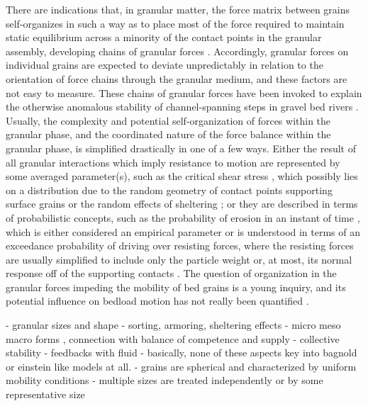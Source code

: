 \documentclass{article}
\begin{document}
{There are indications that, in granular matter, the force matrix between grains self-organizes in such a way as to place most of the force required to maintain static equilibrium across a minority of the contact points in the granular assembly, developing chains of granular forces \citep{Peters2005, Corwin2005, Liu2010}. 
Accordingly, granular forces on individual grains are expected to deviate unpredictably in relation to the orientation of force chains through the granular medium, and these factors are not easy to measure. 
These chains of granular forces have been invoked to explain the otherwise anomalous stability of channel-spanning steps in gravel bed rivers \citep{Zimmerman2010, Saletti2016}. 
Usually, the complexity and potential self-organization of forces within the granular phase, and the coordinated nature of the force balance within the granular phase, is simplified drastically in one of a few ways. 
Either the result of all granular interactions which imply resistance to motion are represented by some averaged parameter(s), such as the critical shear stress \citep{Shields1936, Montgomery1997}, which possibly lies on a distribution due to the random geometry of contact points supporting surface grains or the random effects of sheltering \citep{Wiberg1987, Bridge1992, Ferreira2015}; or they are described in terms of probabilistic concepts, such as the probability of erosion in an instant of time \citep{Einstein1950}, which is either considered an empirical parameter \citep{Ancey2008} or is understood in terms of an exceedance probability of driving over resisting forces, where the resisting forces are usually simplified to include only the particle weight \citep{Einstein1950} or, at most, its normal response off of the supporting contacts \citep{Paintal1971, Dey2018}.
The question of organization in the granular forces impeding the mobility of bed grains is a young inquiry, and its potential influence on bedload motion has not really been quantified \citep{}.  

- granular sizes and shape
- sorting, armoring, sheltering effects
- micro meso macro forms , connection with balance of competence and supply 
- collective stability 
- feedbacks with fluid
- basically, none of these aspects key into bagnold or einstein like models at all. 
- grains are spherical and characterized by uniform mobility conditions
- multiple sizes are treated independently or by some representative size

}
\end{document}
